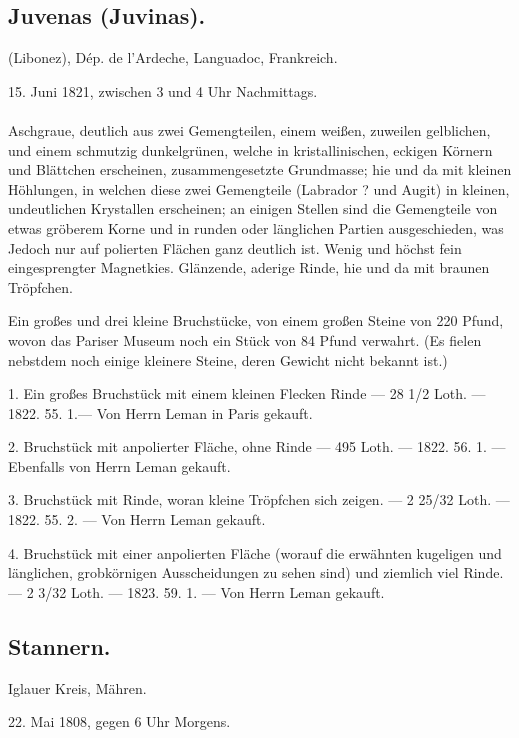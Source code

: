 \documentclass[a4paper, 11pt, oneside, polutonikogreek, german]{article}
\begin{document}
\subsection{Juvenas (Juvinas).}
\begin{center}
\small
(Libonez), Dép. de l'Ardeche, Languadoc, Frankreich.

15. Juni 1821, zwischen 3 und 4 Uhr Nachmittags.
\end{center}
\paragraph{}
Aschgraue, deutlich aus zwei Gemengteilen, einem weißen, zuweilen gelblichen, und einem schmutzig dunkelgrünen, welche in kristallinischen, eckigen Körnern und Blättchen erscheinen, zusammengesetzte Grundmasse; hie und da mit kleinen Höhlungen, in welchen diese zwei Gemengteile (Labrador ? und Augit) in kleinen, undeutlichen Krystallen erscheinen; an einigen Stellen sind die Gemengteile von etwas gröberem Korne und in runden oder länglichen Partien ausgeschieden, was Jedoch nur auf polierten Flächen ganz deutlich ist. Wenig und höchst fein eingesprengter Magnetkies. Glänzende, aderige Rinde, hie und da mit braunen Tröpfchen.

Ein großes und drei kleine Bruchstücke, von einem großen Steine von 220 Pfund, wovon das Pariser Museum noch ein Stück von 84 Pfund verwahrt. (Es fielen nebstdem noch einige kleinere Steine, deren Gewicht nicht bekannt ist.)

1. Ein großes Bruchstück mit einem kleinen Flecken Rinde — 28 1/2 Loth. — 1822. 55. 1.— Von Herrn Leman in Paris gekauft.

2. Bruchstück mit anpolierter Fläche, ohne Rinde — 495 Loth. — 1822. 56. 1. — Ebenfalls von Herrn Leman gekauft.

3. Bruchstück mit Rinde, woran kleine Tröpfchen sich zeigen. — 2 25/32 Loth. — 1822. 55. 2. — Von Herrn Leman gekauft.

4. Bruchstück mit einer anpolierten Fläche (worauf die erwähnten kugeligen und länglichen, grobkörnigen Ausscheidungen zu sehen sind) und ziemlich viel Rinde. — 2 3/32 Loth. — 1823. 59. 1. — Von Herrn Leman gekauft.
\subsection{Stannern.}
\begin{center}
\small
Iglauer Kreis, Mähren.

22. Mai 1808, gegen 6 Uhr Morgens.
\end{center}
\end{document}
